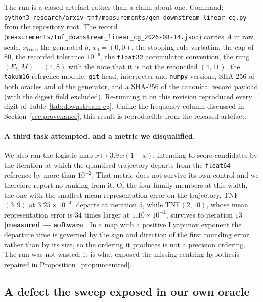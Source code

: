 \begin{sloppypar}
The run is a closed artefact rather than a claim about one. Command:
\texttt{python3}\ \texttt{research/}\allowbreak\texttt{arxiv\_tnf/}\allowbreak\texttt{measurements/}\allowbreak\texttt{gen\_downstream\_}\allowbreak\texttt{linear\_cg.py}
from the repository root. The record
(\texttt{measurements/}\allowbreak\texttt{tnf\_downstream\_}\allowbreak\texttt{linear\_cg\_}\allowbreak\texttt{2026-08-14.json}) carries $A$ in
raw scale, $x_{\text{true}}$, the generated $b$, $x_0 = (0,0)$, the stopping rule
verbatim, the cap of $80$, the recorded tolerance $10^{-6}$, the $\texttt{float32}$
accumulator convention, the rung $(E_t,M)=(4,8)$ with the note that it is not the
reconciled $(4,11)$, the \texttt{takum16} reference module, \texttt{git} head,
interpreter and \texttt{numpy} versions, SHA-256 of both oracles and of the
generator, and a SHA-256 of the canonical record payload (with the digest field
excluded). Re-running it on this revision reproduced
every digit of Table~\ref{tab:downstream-cg}. Unlike the frequency column discussed
in Section~\ref{sec:provenance}, this result is reproducible from the released
artefact.
\end{sloppypar}

\paragraph{A third task attempted, and a metric we disqualified.} We also ran the
logistic map $x \mapsto 3.9\,x(1-x)$, intending to score candidates by the
iteration at which the quantised trajectory departs from the \texttt{float64}
reference by more than $10^{-2}$. That metric does not survive its own control and
we therefore report no ranking from it. Of the four family members at this width,
the one with the smallest mean representation error on the trajectory, TNF$(3,9)$
at $3.25\times10^{-4}$, departs at iteration $5$, while TNF$(2,10)$, whose mean
representation error is $34$ times larger at $1.10\times10^{-2}$, survives to
iteration $13$ \textbf{[measured --- software]}. In a map with a positive Lyapunov
exponent the departure time is governed by the sign and direction of the first
rounding error rather than by its size, so the ordering it produces is not a
precision ordering. The run was not wasted: it is what exposed the missing
centring hypothesis repaired in Proposition~\ref{prop:uncentred}.

\subsection{A defect the sweep exposed in our own oracle}
\label{sec:oracledefect}


